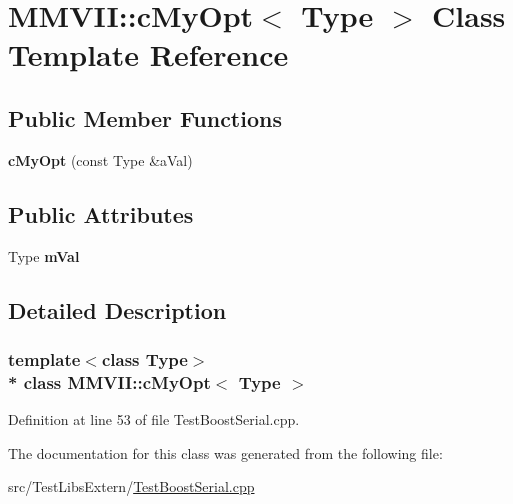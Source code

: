 \hypertarget{classMMVII_1_1cMyOpt}{}\section{M\+M\+V\+II\+:\+:c\+My\+Opt$<$ Type $>$ Class Template Reference}
\label{classMMVII_1_1cMyOpt}
\subsection*{Public Member Functions}
\begin{DoxyCompactItemize}
\item 
{\bfseries c\+My\+Opt} (const Type \&a\+Val)\hypertarget{classMMVII_1_1cMyOpt_aa7c5fd60f622cd4bbe0aba8574e38391}{}\label{classMMVII_1_1cMyOpt_aa7c5fd60f622cd4bbe0aba8574e38391}

\end{DoxyCompactItemize}
\subsection*{Public Attributes}
\begin{DoxyCompactItemize}
\item 
Type {\bfseries m\+Val}\hypertarget{classMMVII_1_1cMyOpt_a189447c9d2e11f055b4fcfc49950b6b5}{}\label{classMMVII_1_1cMyOpt_a189447c9d2e11f055b4fcfc49950b6b5}

\end{DoxyCompactItemize}


\subsection{Detailed Description}
\subsubsection*{template$<$class Type$>$\\*
class M\+M\+V\+I\+I\+::c\+My\+Opt$<$ Type $>$}



Definition at line 53 of file Test\+Boost\+Serial.\+cpp.



The documentation for this class was generated from the following file\+:\begin{DoxyCompactItemize}
\item 
src/\+Test\+Libs\+Extern/\hyperlink{TestBoostSerial_8cpp}{Test\+Boost\+Serial.\+cpp}\end{DoxyCompactItemize}
